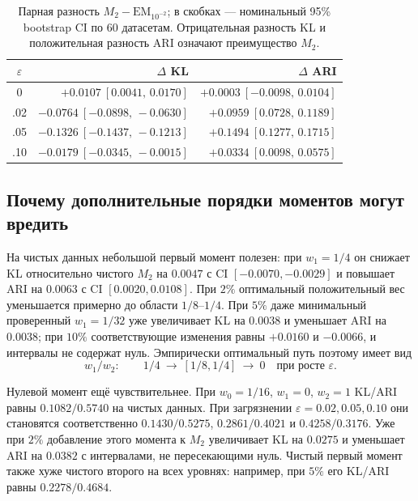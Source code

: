 \documentclass[11pt,a4paper]{article}
\newcommand{\Mtwo}{M_2}
\begin{document}
\begin{table}[ht]
\centering
\small
\caption{Парная разность $\Mtwo-\mathrm{EM}_{10^{-2}}$; в скобках ---
номинальный 95\% bootstrap CI по 60 датасетам. Отрицательная разность KL
и положительная разность ARI означают преимущество $\Mtwo$.}
\label{tab:paired}
\begin{tabularx}{0.94\linewidth}{@{}cRR@{}}
\toprule
$\varepsilon$ & $\Delta$ KL & $\Delta$ ARI \\
    & $+0.0107\ [0.0041,\,0.0170]$ & $+0.0003\ [-0.0098,\,0.0104]$ \\
.02  & $-0.0764\ [-0.0898,\,-0.0630]$ & $+0.0959\ [0.0728,\,0.1189]$ \\
.05  & $-0.1326\ [-0.1437,\,-0.1213]$ & $+0.1494\ [0.1277,\,0.1715]$ \\
.10  & $-0.0179\ [-0.0345,\,-0.0015]$ & $+0.0334\ [0.0098,\,0.0575]$ \\
\bottomrule
\end{tabularx}
\end{table}

\subsection{Почему дополнительные порядки моментов могут вредить}

На чистых данных небольшой первый момент полезен: при $w_1=1/4$ он снижает
KL относительно чистого $\Mtwo$ на $0.0047$ с CI
$[-0.0070,-0.0029]$ и повышает ARI на $0.0063$ с CI
$[0.0020,0.0108]$. При $2\%$ оптимальный положительный вес уменьшается примерно
до области $1/8$--$1/4$. При $5\%$ даже минимальный проверенный $w_1=1/32$
уже увеличивает
KL на $0.0038$ и уменьшает ARI на $0.0038$; при $10\%$ соответствующие
изменения равны $+0.0160$ и $-0.0066$, и интервалы не содержат нуль.
Эмпирически оптимальный путь поэтому имеет вид
\begin{equation}
  w_1/w_2:\qquad 1/4\ \longrightarrow\ [1/8,1/4]\ \longrightarrow\ 0
  \quad\text{при росте }\varepsilon.
\end{equation}

Нулевой момент ещё чувствительнее. При $w_0=1/16$, $w_1=0$, $w_2=1$ KL/ARI
равны $0.1082/0.5740$ на чистых данных. При загрязнении
$\varepsilon=0.02,0.05,0.10$ они становятся соответственно
$0.1430/0.5275$, $0.2861/0.4021$ и $0.4258/0.3176$. Уже при $2\%$ добавление
этого момента к $\Mtwo$ увеличивает KL на $0.0275$ и уменьшает ARI на
$0.0382$ с интервалами, не
пересекающими нуль. Чистый первый момент также хуже чистого второго на всех
уровнях: например, при $5\%$ его KL/ARI равны $0.2278/0.4684$.
\end{document}
